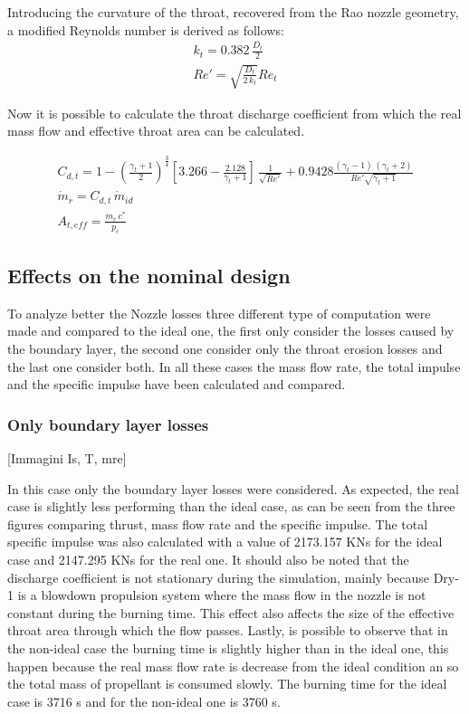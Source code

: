 \begin{itemize}
    Introducing the curvature of the throat, recovered from the Rao nozzle geometry, a modified Reynolds number is derived as follows:
    \begin{gather}
        k_t = 0.382 \, \frac{D_t}{2} \\
        Re'=\sqrt{\frac{D_t}{2 \, k_t}}Re_t
    \end{gather}  

    Now it is possible to calculate the throat discharge coefficient from which the real mass flow and effective throat area can be calculated.  

    \begin{gather}
        C_{d,t} = 1 - \left( \frac{\gamma_t+1}{2} \right)^{\frac{3}{4}}
        \left[3.266 - \frac{2.128}{\gamma_t+1} \right] \, \frac{1}{\sqrt{Re'}} + 0.9428 \frac{(\gamma_t - 1) \, (\gamma_t + 2)}{Re' \sqrt{\gamma_t + 1}} \\
        \dot{m}_r = C_{d,t} \, \dot{m}_{id} \\
        A_{t,eff} = \frac{\dot{m}_r \, c^*}{p_c}
    \end{gather}
\end{itemize}

\subsection{Effects on the nominal design}  

To analyze better the Nozzle losses three different type of computation were made and compared to the ideal one, the first only consider the losses caused by the boundary layer, the second one consider only the throat erosion losses and the last one consider both. In all these cases the mass flow rate, the total impulse and the specific impulse have been calculated and compared.  

 

\subsubsection{Only boundary layer losses}  

[Immagini Is, T, mre] 

In this case only the boundary layer losses were considered. As expected, the real case is slightly less performing than the ideal case, as can be seen from the three figures comparing thrust, mass flow rate and the specific impulse. The total specific impulse was also calculated with a value of 2173.157 KNs for the ideal case and 2147.295 KNs for the real one. It should also be noted that the discharge coefficient is not stationary during the simulation, mainly because Dry-1 is a blowdown propulsion system where the mass flow in the nozzle is not constant during the burning time. This effect also affects the size of the effective throat area through which the flow passes. Lastly, is possible to observe that in the non-ideal case the burning time is slightly higher than in the ideal one, this happen because the real mass flow rate is decrease from the ideal condition an so the total mass of propellant is consumed slowly. The burning time for the ideal case is 3716 s and for the non-ideal one is 3760 s.             

